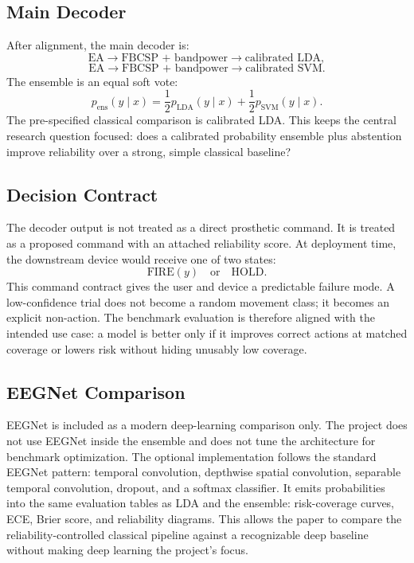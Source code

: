 \documentclass[11pt]{article}
\begin{document}
\subsection{Main Decoder}

After alignment, the main decoder is:
\[
  \text{EA} \rightarrow \text{FBCSP + bandpower} \rightarrow
  \text{calibrated LDA},
\]
\[
  \text{EA} \rightarrow \text{FBCSP + bandpower} \rightarrow
  \text{calibrated SVM}.
\]
The ensemble is an equal soft vote:
\[
  p_{\mathrm{ens}}(y \mid x) =
  \frac{1}{2}p_{\mathrm{LDA}}(y \mid x)
  + \frac{1}{2}p_{\mathrm{SVM}}(y \mid x).
\]
The pre-specified classical comparison is calibrated LDA. This keeps the
central research question focused: does a calibrated probability ensemble plus
abstention improve reliability over a strong, simple classical baseline?

\subsection{Decision Contract}

The decoder output is not treated as a direct prosthetic command. It is treated
as a proposed command with an attached reliability score. At deployment time,
the downstream device would receive one of two states:
\[
  \text{FIRE}(y) \quad \text{or} \quad \text{HOLD}.
\]
This command contract gives the user and device a predictable failure mode. A
low-confidence trial does not become a random movement class; it becomes an
explicit non-action. The benchmark evaluation is therefore aligned with the
intended use case: a model is better only if it improves correct actions at
matched coverage or lowers risk without hiding unusably low coverage.

\subsection{EEGNet Comparison}

EEGNet is included as a modern deep-learning comparison only. The project does
not use EEGNet inside the ensemble and does not tune the architecture for
benchmark optimization. The optional implementation follows the standard
EEGNet pattern: temporal convolution, depthwise spatial convolution,
separable temporal convolution, dropout, and a softmax classifier. It emits
probabilities into the same evaluation tables as LDA and the ensemble:
risk-coverage curves, ECE, Brier score, and reliability diagrams. This allows
the paper to compare the reliability-controlled classical pipeline against a
recognizable deep baseline without making deep learning the project's focus.
\end{document}
